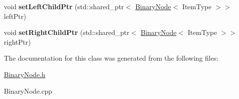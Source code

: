\begin{DoxyCompactItemize}
\item 
void {\bfseries set\+Left\+Child\+Ptr} (std\+::shared\+\_\+ptr$<$ \hyperlink{class_binary_node}{Binary\+Node}$<$ Item\+Type $>$$>$ left\+Ptr)\hypertarget{class_binary_node_ac8ba1830714efe7690978c2a3c22c6ea}{}\label{class_binary_node_ac8ba1830714efe7690978c2a3c22c6ea}

\item 
void {\bfseries set\+Right\+Child\+Ptr} (std\+::shared\+\_\+ptr$<$ \hyperlink{class_binary_node}{Binary\+Node}$<$ Item\+Type $>$$>$ right\+Ptr)\hypertarget{class_binary_node_a331a33b8ebc6baeb66af7e0adb46d760}{}\label{class_binary_node_a331a33b8ebc6baeb66af7e0adb46d760}

\end{DoxyCompactItemize}


The documentation for this class was generated from the following files\+:\begin{DoxyCompactItemize}
\item 
\hyperlink{_binary_node_8h}{Binary\+Node.\+h}\item 
Binary\+Node.\+cpp\end{DoxyCompactItemize}
